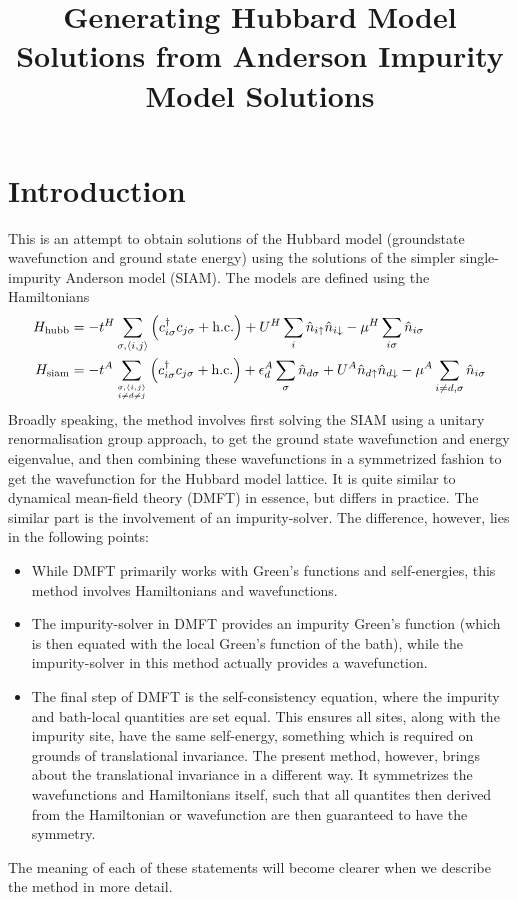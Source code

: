 \documentclass{article}
\title{Generating Hubbard Model Solutions from Anderson Impurity Model Solutions}
\author{}%
\numberwithin{equation}{section}
\begin{document}
\maketitle
\section{Introduction}
This is an attempt to obtain solutions of the Hubbard model (groundstate wavefunction and ground state energy) using the solutions of the simpler single-impurity Anderson model (SIAM). The models are defined using the Hamiltonians
\begin{equation}\begin{aligned}
H_\text{hubb} &= -t^H\sum_{\sigma,\left<i,j \right>}\left(c^\dagger_{i\sigma} c_{j\sigma} + \text{h.c.}\right) + U^H\sum_i \hat n_{i \uparrow} \hat n_{i \downarrow} - \mu^H \sum_{i\sigma}\hat n_{i\sigma}\\
	H_\text{siam} &= -t^A\sum_{\sigma,\left<i,j \right>\atop{i \neq d \neq j}}\left(c^\dagger_{i\sigma} c_{j\sigma} + \text{h.c.}\right) + \epsilon_d^A \sum_\sigma\hat n_{d\sigma} + U^A \hat n_{d \uparrow} \hat n_{d \downarrow} - \mu^A \sum_{i\neq d,\sigma}\hat n_{i\sigma}
\end{aligned}\end{equation}
Broadly speaking, the method involves first solving the SIAM using a unitary renormalisation group approach, to get the ground state wavefunction and energy eigenvalue, and then combining these wavefunctions in a symmetrized fashion to get the wavefunction for the Hubbard model lattice. It is quite similar to dynamical mean-field theory (DMFT) in essence, but differs in practice. The similar part is the involvement of an impurity-solver. The difference, however, lies in the following points:
\begin{itemize}
	\item While DMFT primarily works with Green's functions and self-energies, this method involves Hamiltonians and wavefunctions.
	\item The impurity-solver in DMFT provides an impurity Green's function (which is then equated with the local Green's function of the bath), while the impurity-solver in this method actually provides a wavefunction.
	\item The final step of DMFT is the self-consistency equation, where the impurity and bath-local quantities are set equal. This ensures all sites, along with the impurity site, have the same self-energy, something which is required on grounds of  translational invariance. The present method, however, brings about the translational invariance in a different way. It symmetrizes the wavefunctions and Hamiltonians itself, such that all quantites then derived from the Hamiltonian or wavefunction are then guaranteed to have the symmetry.
\end{itemize}
The meaning of each of these statements will become clearer when we describe the method in more detail.
\end{document}
